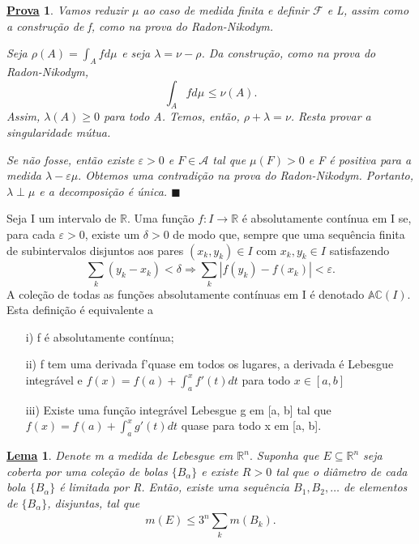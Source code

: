 \documentclass{article}
\newtheorem*{lemma*}{\underline{Lema}}
\newtheorem*{proof*}{\underline{Prova}}
\renewcommand\qedsymbol{$\blacksquare$}
\begin{document}
\begin{proof*}
  Vamos reduzir \(\mu \) ao caso de medida finita e definir \(\mathcal{F}\) e L, assim como a construção de f, como na prova do Radon-Nikodym.

  Seja \(\rho (A) = \int_{A}f d\mu_{}\) e seja \(\lambda = \nu - \rho\). Da construção, como na prova do Radon-Nikodym, 
    \[
      \int_{A}f d\mu_{}\leq \nu (A).
    \]
  Assim, \(\lambda (A) \geq 0\) para todo A. Temos, então, \(\rho + \lambda = \nu \). Resta provar a singularidade mútua. 

  Se não fosse, então existe \(\varepsilon > 0\) e \(F\in \mathcal{A}\) tal que \(\mu (F) > 0\) e F é positiva para a medida \(\lambda -\varepsilon \mu .\) Obtemos uma contradição na prova do Radon-Nikodym. Portanto, \(\lambda \perp \mu \) e a decomposição é única. \qedsymbol
\end{proof*}
 Seja I um intervalo de \(\mathbb{R}.\) Uma função \(f:I\rightarrow \mathbb{R}\) é absolutamente contínua em I se, para cada \(\varepsilon  > 0\), existe um \(\delta > 0\) de modo que, sempre que uma sequência finita de subintervalos disjuntos aos pares \((x_{k}, y_{k})\in I\) com \(x_{k}, y_{k}\in I\) satisfazendo 
   \[
     \sum\limits_{k}^{}(y_{k}-x_{k}) < \delta \Rightarrow \sum\limits_{k}^{}|f(y_{k}) - f(x_{k})| < \varepsilon .
   \]
   A coleção de todas as funções absolutamente contínuas em I é denotado \(\mathbb{AC}(I).\) Esta definição é equivalente a 
  \begin{itemize}
    \item[i)] f é absolutamente contínua; 
    \item[ii)] f tem uma derivada f'quase em todos os lugares, a derivada é Lebesgue integrável e \(f(x) = f(a) + \int_{a}^{x}f'(t)dt\) para todo \(x\in [a, b]\)
    \item[iii)] Existe uma função integrável Lebesgue g em [a, b] tal que \(f(x) = f(a) + \int_{a}^{x}g'(t)dt\) quase para todo x em [a, b].
  \end{itemize}
 \begin{lemma*}
   Denote m a medida de Lebesgue em \(\mathbb{R}^{n}.\) Suponha que \(E\subseteq \mathbb{R}^{n}\) seja coberta por uma coleção de bolas \(\{B_{\alpha }\} \) e existe \(R> 0\) tal que o diâmetro de cada bola \(\{B_{\alpha }\}\) é limitada por R. 
  Então, existe uma sequência \(B_{1}, B_{2}, \dotsc \) de elementos de \(\{B_{\alpha }\}\), disjuntas, tal que 
    \[
      m(E) \leq 3^{n}\sum\limits_{k}^{}m(B_{k}).
    \]
 \end{lemma*}
\end{document}
